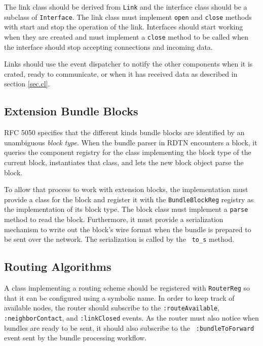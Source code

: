 \documentclass{article}
\begin{document}
The link class should be derived from {\tt Link} and the interface class should
be a subclass of {\tt Interface}.  The link class must implement {\tt open} and
{\tt close} methods with start and stop the operation of the link. Interfaces
should start working when they are created and must implement a {\tt close}
method to be called when the interface should stop accepting connections and
incoming data.

Links should use the event dispatcher to notify the other components when it is
crated, ready to communicate, or when it has received data as described in
section \ref{sec.cl}.

\subsection{Extension Bundle Blocks}\label{sec.ext.blocks}

RFC 5050 \cite{bundle-spec} specifies that the different kinds bundle blocks are
identified by an unambiguous {\em block type}. When the bundle parser in RDTN
encounters a block, it queries the component registry for the class implementing
the block type of the current block, instantiates that class, and lets the new
block object parse the block.

To allow that process to work with extension blocks, the implementation must
provide a class for the block and register it with the {\tt BundleBlockReg}
registry as the implementation of its block type. The block class must implement
a {\tt parse} method to read the block. Furthermore, it must provide a
serialization mechanism to write out the block's wire format when the bundle is
prepared to be sent over the network. The serialization is called by the {\tt
to\_s} method.

\subsection{Routing Algorithms}\label{sec.ext.routing}

A class implementing a routing scheme should be registered with {\tt RouterReg}
so that it can be configured using a symbolic name. In order to keep track of
available nodes, the router should subscribe to the {\tt :routeAvailable}, {\tt
:neighborContact}, and {\tt :linkClosed} events. As the router must also notice
when bundles are ready to be sent, it should also subscribe to the {\tt
:bundleToForward} event sent by the bundle processing workflow.
\end{document}
